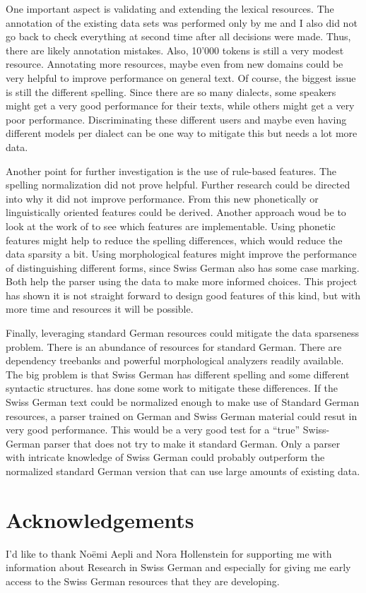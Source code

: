\documentclass[11pt,letterpaper, covington]{article}
\begin{document}
One important aspect is validating and extending the lexical resources. The annotation of the existing data sets was performed only by me and I also did not go back to check everything at second time after all decisions were made. Thus, there are likely annotation mistakes. Also, 10'000 tokens is still a very modest resource. Annotating more resources, maybe even from new domains could be very helpful to improve performance on general text. Of course, the biggest issue is still the different spelling. Since there are so many dialects, some speakers might get a very good performance for their texts, while others might get a very poor performance. Discriminating these different users and maybe even having different models per dialect can be one way to mitigate this but needs a lot more data.

Another point for further investigation is the use of rule-based features. The spelling normalization did not prove helpful. Further research could be directed into why it did not improve performance. From this new phonetically or linguistically oriented features could be derived. Another approach woud be to look at the work of \citet{SR10} to see which features are implementable. Using phonetic features might help to reduce the spelling differences, which would reduce the data sparsity a bit. Using morphological features might improve the performance of distinguishing different forms, since Swiss German also has some case marking. Both help the parser using the data to make more informed choices. This project has shown it is not straight forward to design good features of this kind, but with more time and resources it will be possible.

Finally, leveraging standard German resources could mitigate the data sparseness problem. There is an abundance of resources for standard German. There are dependency treebanks and powerful morphological analyzers readily available. The big problem is that Swiss German has different spelling and some different syntactic structures. \citet{Scherrer11} has done some work to mitigate these differences. If the Swiss German text could be normalized enough to make use of Standard German resources, a parser trained on German and Swiss German material could resut in very good performance. This would be a very good test for a ``true'' Swiss-German parser that does not try to make it standard German. Only a parser with intricate knowledge of Swiss German could probably outperform the normalized standard German version that can use large amounts of existing data. 

\section{Acknowledgements}
I'd like to thank Noëmi Aepli and Nora Hollenstein for supporting me with information about Research in Swiss German and especially for giving me early access to the Swiss German resources that they are developing. 



\label{lastpage}
\end{document}
